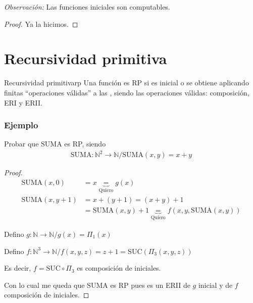 \bigskip
\textit{Observación:}
Las funciones iniciales son computables.

\begin{proof}
    Ya la hicimos.
\end{proof}

\section{Recursividad primitiva}

%
\begin{definicion}{Recursividad primitiva}{rp}
    Una función es RP si es inicial o se obtiene aplicando finitas 
    ``operaciones válidas'' a las ,
    siendo las operaciones válidas: composición, ERI y ERII.
\end{definicion}


\subsubsection{Ejemplo}

Probar que $\mathrm{SUMA}$ es RP, siendo
\begin{gather*}
    \mathrm{SUMA}: \mathbb{N}^2 \to \mathbb{N} / \mathrm{SUMA}(x,y) = x+y
\end{gather*}

\begin{proof} \phantom{.}

    \begin{align*}
        \mathrm{SUMA}(x,0) &= x \underbrace{=}_{\text{Quiero}} g(x) \\
        \mathrm{SUMA} (x,y+1) &= x + (y+1) = (x+y) + 1 \\ 
        &= \mathrm{SUMA}(x,y)+1
        \underbrace{=}_{\text{Quiero}} f(x,y,\mathrm{SUMA}(x,y))
    \end{align*}

    Defino $g: \mathbb{N} \to \mathbb{N} / g(x) = \Pi_1 (x)$

    Defino $f: \mathbb{N}^3 \to \mathbb{N} / f(x,y,z) = z+1 
    = \mathrm{SUC}(\Pi_3 (x,y,z))$


    Es decir, $f = \mathrm{SUC} \circ \Pi_3$ es composición de iniciales.

    Con lo cual me queda que $\mathrm{SUMA}$ es RP pues es un ERII de $g$
    inicial y de $f$ composición de iniciales.

\end{proof}

